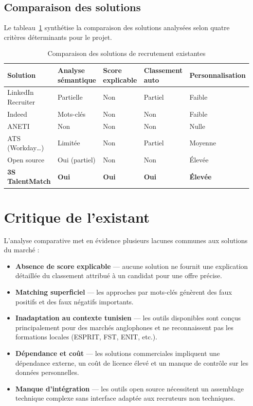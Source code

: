 \documentclass[12pt,a4paper]{report}
\begin{document}
\subsection{Comparaison des solutions}

Le tableau~\ref{tab:comparaison} synthétise la comparaison des solutions analysées selon quatre critères déterminants pour le projet.

\begin{table}[H]
\centering
\caption{Comparaison des solutions de recrutement existantes}
\label{tab:comparaison}
\begin{tabularx}{\textwidth}{lXXXX}
\toprule
\textbf{Solution} & \textbf{Analyse sémantique} & \textbf{Score explicable} & \textbf{Classement auto} & \textbf{Personnalisation} \\
\midrule
LinkedIn Recruiter & Partielle   & Non & Partiel & Faible  \\
Indeed             & Mots-clés   & Non & Non     & Faible  \\
ANETI              & Non         & Non & Non     & Nulle   \\
ATS (Workday…)    & Limitée     & Non & Partiel & Moyenne \\
Open source        & Oui (partiel) & Non & Non   & Élevée  \\
\textbf{3S TalentMatch} & \textbf{Oui} & \textbf{Oui} & \textbf{Oui} & \textbf{Élevée} \\
\bottomrule
\end{tabularx}
\end{table}

\section{Critique de l'existant}

L'analyse comparative met en évidence plusieurs lacunes communes aux solutions du marché :

\begin{itemize}
  \item \textbf{Absence de score explicable} — aucune solution ne fournit une explication détaillée du classement attribué à un candidat pour une offre précise.
  \item \textbf{Matching superficiel} — les approches par mots-clés génèrent des faux positifs et des faux négatifs importants.
  \item \textbf{Inadaptation au contexte tunisien} — les outils disponibles sont conçus principalement pour des marchés anglophones et ne reconnaissent pas les formations locales (ESPRIT, FST, ENIT, etc.).
  \item \textbf{Dépendance et coût} — les solutions commerciales impliquent une dépendance externe, un coût de licence élevé et un manque de contrôle sur les données personnelles.
  \item \textbf{Manque d'intégration} — les outils open source nécessitent un assemblage technique complexe sans interface adaptée aux recruteurs non techniques.
\end{itemize}
\end{document}
